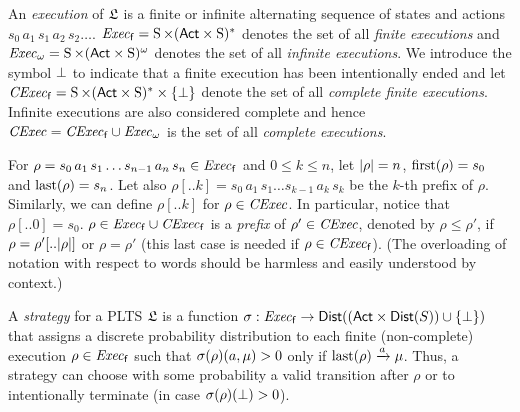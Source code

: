 
An \emph{execution} of $\mathfrak{L}$ is a finite or infinite alternating
sequence of states and actions $s_0\, a_1\, s_1\, a_2\, s_2\ldots$.
$\mathit{Exec}_{\mathsf{f}}= \operatorname{S}\times({\rm \sf Act}\times\operatorname{S})^*$ denotes the set of all
\emph{finite executions} and $\mathit{Exec}_\omega= \operatorname{S}\times({\rm \sf Act}\times\operatorname{S})^\omega$
denotes the set of all \emph{infinite executions}.
%
We introduce the symbol $\bot$ to indicate that a finite
execution has been intentionally ended and let $\mathit{CExec}_{\mathsf{f}}=
\operatorname{S}\times({\rm \sf Act}\times\operatorname{S})^*\times\{\bot\}$ denote the set of all
\emph{complete finite executions}.  Infinite executions are also
considered complete and hence $\mathit{CExec}=\mathit{CExec}_{\mathsf{f}}\cup\mathit{Exec}_\omega$ is the
set of all \emph{complete executions}.

For $\rho = s_0\, a_1\, s_1\ldots s_{n-1}\, a_n\, s_n \in \mathit{Exec}_{\mathsf{f}}$ and
$0\leq k\leq n$, let ${|}{\rho}{|}=n$, $\mathrm{first}(\rho)=s_0$ and
$\mathrm{last}(\rho)=s_n$.
%
Let also $\rho[..k] = s_0\, a_1\, s_1\ldots s_{k-1}\, a_k\, s_k$ be
the $k$-th prefix of $\rho$.
%
Similarly, we can define $\rho[..k]$ for $\rho\in\mathit{CExec}$.
In particular, notice that $\rho[..0]=s_0$.
%
$\rho \in \mathit{Exec}_{\mathsf{f}}\cup\mathit{CExec}_{\mathsf{f}}$ is a \emph{prefix} of $\rho' \in \mathit{CExec}$,
denoted by $\rho\leq\rho'$, if $\rho=\rho'[..{|}{\rho}{|}]$ or $\rho=\rho'$
(this last case is needed if $\rho\in\mathit{CExec}_{\mathsf{f}}$).
%
(The overloading of notation with respect to words should be harmless
and easily understood by context.)

A \emph{strategy} for a PLTS $\mathfrak{L}$ is a function $\sigma:
\mathit{Exec}_{\mathsf{f}} \to \mathsf{Dist}(({\rm \sf Act}\times\mathsf{Dist}(S))\cup\{\bot\})$ that assigns
a discrete probability distribution to each finite (non-complete)
execution $\rho\in\mathit{Exec}_{\mathsf{f}}$ such that $\sigma(\rho)(a,\mu) > 0$ only
if $\mathrm{last}(\rho)\xrightarrow{a}\mu$.  Thus, a strategy can choose with some
probability a valid transition after $\rho$ or to intentionally
terminate (in case $\sigma(\rho)(\bot)>0$).

